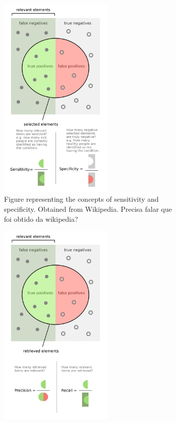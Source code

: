 \begin{figure}[ht]
\centering
\begin{subfigure}[b]{0.48\textwidth}
\centering
\includegraphics[width=0.6\textwidth]{TruePosWikipedia}
\caption{Figure representing the concepts of sensitivity and specificity. Obtained from Wikipedia. {\color{orange} Precisa falar que foi obtido da wikipedia?}}\label{fig:TruePosWikipedia}
\end{subfigure}
\hfill
\begin{subfigure}[b]{0.48\textwidth}
\centering
\includegraphics[width=0.6\textwidth]{PrecisionrecallWikipedia}

\end{subfigure}
\end{figure}
